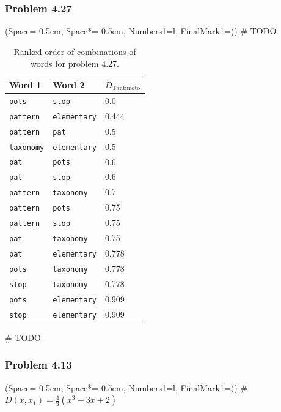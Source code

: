 \documentclass[12pt, a4paper]{article}
\newcommand{\listSpace}{-0.5em}%
\begin{document}
\subsubsection*{Problem 4.27}
\begin{easylist}[enumerate]
\ListProperties(Space=\listSpace, Space*=\listSpace, Numbers1=l, FinalMark1={)})
# TODO

\begin{table}[ht!]
	\centering
	\caption{Ranked order of combinations of words for problem 4.27.}
	\begin{tabular}{@{}lll@{}} \toprule
	Word 1	& Word 2 & $D_\text{Tantimoto}$ \\ \midrule
	\texttt{pots} & \texttt{stop} &  0.0 \\ 
	\texttt{pattern} & \texttt{elementary} &  0.444 \\ 
	\texttt{pattern} & \texttt{pat} &  0.5 \\ 
	\texttt{taxonomy} & \texttt{elementary} &  0.5 \\ 
	\texttt{pat} & \texttt{pots} &  0.6 \\ 
	\texttt{pat} & \texttt{stop} &  0.6 \\ 
	\texttt{pattern} & \texttt{taxonomy} &  0.7 \\ 
	\texttt{pattern} & \texttt{pots} &  0.75 \\ 
	\texttt{pattern} & \texttt{stop} &  0.75 \\ 
	\texttt{pat} & \texttt{taxonomy} &  0.75 \\ 
	\texttt{pat} & \texttt{elementary} &  0.778 \\ 
	\texttt{pots} & \texttt{taxonomy} &  0.778 \\ 
	\texttt{stop} & \texttt{taxonomy} &  0.778 \\ 
	\texttt{pots} & \texttt{elementary} &  0.909 \\ 
	\texttt{stop} & \texttt{elementary} &  0.909 \\  \bottomrule
	\end{tabular}
	\label{table:problem_4_17}
\end{table}


# TODO
\end{easylist}


\subsubsection*{Problem 4.13}
\begin{easylist}[enumerate]
	\ListProperties(Space=\listSpace, Space*=\listSpace, Numbers1=l, FinalMark1={)})
	# $D(x, x_1) = \frac{4}{3} \left( x^3 - 3x + 2	 \right)$
\end{easylist}
\end{document}
